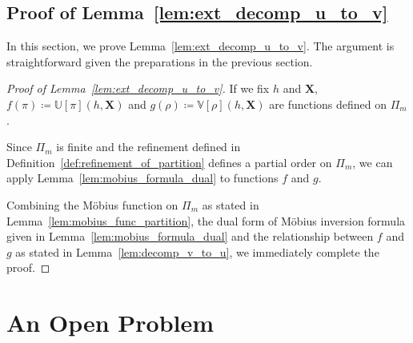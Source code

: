 \documentclass[12pt]{article}
\theoremstyle{plain}
\theoremstyle{definition}
\newcommand{\mobius}{M\"obius}
\newcommand{\sPi}{\pi}
\newcommand{\ustat}{\mathbb{U}}
\newcommand{\vstat}{\mathbb{V}}
\newcommand{\partition}{\Pi}
\newcommand{\partitionp}[1]{\partition_{#1}}
\begin{document}
\begin{bibunit}[agsm]
\subsection{Proof of Lemma~\ref{lem:ext_decomp_u_to_v}}
\label{app:proof_ext_decomp_u_to_v}

In this section, we prove Lemma~\ref{lem:ext_decomp_u_to_v}. The argument is straightforward given the preparations in the previous section.

\begin{proof}[Proof of Lemma~\ref{lem:ext_decomp_u_to_v}]
If we fix $h$ and $\bm{X}$, $f(\sPi) \coloneqq \ustat[\sPi](h,\bm{X})$ and $g(\rho) \coloneqq \vstat[\rho](h,\bm{X})$ are functions defined on $\partitionp{m}$. 

Since $\partitionp{m}$ is finite and the refinement defined in Definition~\ref{def:refinement_of_partition} defines a partial order on $\partitionp{m}$, we can apply Lemma~\ref{lem:mobius_formula_dual} to functions $f$ and $g$. 

Combining the \mobius{} function on $\partitionp{m}$ as stated in Lemma~\ref{lem:mobius_func_partition}, the dual form of \mobius{} inversion formula given in Lemma~\ref{lem:mobius_formula_dual} and the relationship between $f$ and $g$ as stated in Lemma~\ref{lem:decomp_v_to_u}, we immediately complete the proof. 
\end{proof}


\section{An Open Problem}
\label{app:open}


\end{bibunit}
\end{document}
